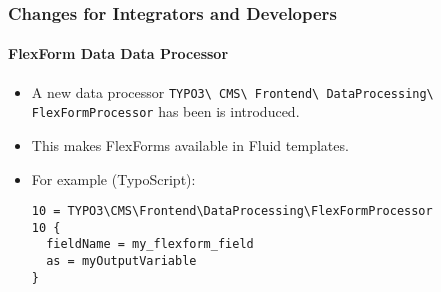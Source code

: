 %

\begin{frame}[fragile]
	\frametitle{Changes for Integrators and Developers}
	\framesubtitle{FlexForm Data Data Processor}


	\begin{itemize}
		\item A new data processor
			\small\texttt{TYPO3\textbackslash
				CMS\textbackslash
				Frontend\textbackslash
				DataProcessing\textbackslash
				FlexFormProcessor}\normalsize
			has been is introduced.
		\item This makes FlexForms available in Fluid templates.
		\item For example (TypoScript):
\begin{lstlisting}
10 = TYPO3\CMS\Frontend\DataProcessing\FlexFormProcessor
10 {
  fieldName = my_flexform_field
  as = myOutputVariable
}\end{lstlisting}

	\end{itemize}

\end{frame}

